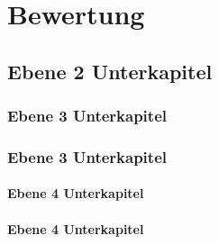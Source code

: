 \section{Bewertung} \label{sec:bewertung}
\subsection{Ebene 2 Unterkapitel} \label{sec:ebene2Unterkapitel}
\subsubsection{Ebene 3 Unterkapitel} \label{sec:ebene3Unterkapitel1}
\subsubsection{Ebene 3 Unterkapitel} \label{sec:ebene3Unterkapitel2}
\paragraph{Ebene 4 Unterkapitel} \label{sec:ebene4Unterkapitel1}
\paragraph{Ebene 4 Unterkapitel} \label{sec:ebene4Unterkapitel2}